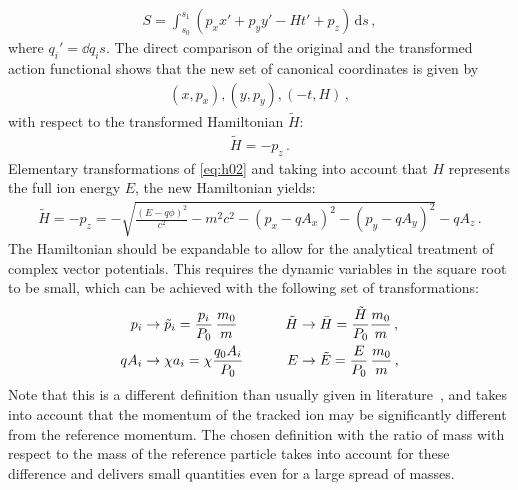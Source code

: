 %
\begin{align}
  S = \int_{s_0}^{s_1} (p_x x' + p_y y' - H t' + p_z) \, \mathrm{d} s \, ,
\end{align}
where $q_i' = \dd{q_i}{s}$. The direct comparison of the original and the transformed action functional shows that the new set of canonical coordinates is given by
%
\begin{align}
  (x,p_x), (y,p_y), (-t,H) \, ,
\end{align}
%
with respect to the transformed Hamiltonian $\tilde{H}$:
%
\begin{align}
  \tilde{H} = -p_z \, .
\end{align}
%
Elementary transformations of \eqref{eq:h02} and taking into account that $H$ represents the full ion energy $E$, the new Hamiltonian yields:
%
\begin{align}
  \tilde{H} = -p_z = - \sqrt{ \frac{(E-q\phi)^2}{c^2} - m^2c^2 - (p_x - q A_x)^2 - (p_y -q  A_y)^2} - q  A_z \, .
\end{align}
%
The Hamiltonian should be expandable to allow for the analytical treatment of complex vector potentials. This requires the dynamic variables in the square root to be small, which can be achieved with the following set of transformations:
%
\begin{alignat}{4}
p_i &\rightarrow \tilde{p}_i = \frac{p_i}{P_0} \, \frac{m_0}{m} \quad \quad &\tilde{H} &\rightarrow \bar{H} = \frac{\tilde{H}}{P_0}  \frac{m_0}{m} \, , \notag \\
q A_i &\rightarrow \chi a_i = \chi \frac{q_0 A_i}{P_0}  \quad \quad &E &\rightarrow \tilde{E} = \frac{E}{P_0} \, \frac{m_0}{m} \, , \label{eq:normalization_H}
\end{alignat}
%
Note that this is a different definition than usually given in literature~\cite{ProceedingsCAS1995}, and takes into account that the momentum of the tracked ion may be significantly different from the reference momentum. The chosen definition with the ratio of mass with respect to the mass of the reference particle takes into account for these difference and delivers small quantities even for a large spread of masses.

